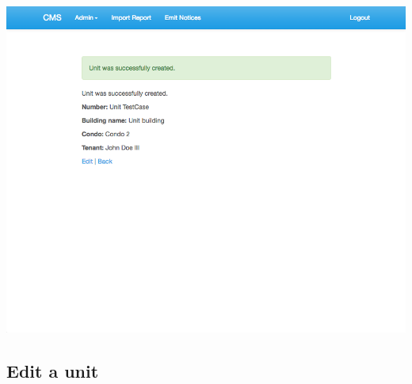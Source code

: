 \begin{itemize}
    \includegraphics[scale=0.25]{./images/ss/unit/create/5.png}
\end{itemize}

\subsection*{Edit a unit}

